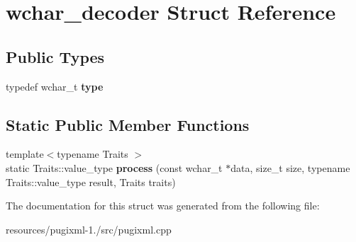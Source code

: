\hypertarget{structwchar__decoder}{\section{wchar\+\_\+decoder Struct Reference}
\label{structwchar__decoder}
}
\subsection*{Public Types}
\begin{DoxyCompactItemize}
\item 
\hypertarget{structwchar__decoder_aafb01f17f51c610468f88b8820e36b7a}{typedef wchar\+\_\+t {\bfseries type}}\label{structwchar__decoder_aafb01f17f51c610468f88b8820e36b7a}

\end{DoxyCompactItemize}
\subsection*{Static Public Member Functions}
\begin{DoxyCompactItemize}
\item 
\hypertarget{structwchar__decoder_a965801bc1ce931281e10ee153586071c}{{\footnotesize template$<$typename Traits $>$ }\\static Traits\+::value\+\_\+type {\bfseries process} (const wchar\+\_\+t $\ast$data, size\+\_\+t size, typename Traits\+::value\+\_\+type result, Traits traits)}\label{structwchar__decoder_a965801bc1ce931281e10ee153586071c}

\end{DoxyCompactItemize}


The documentation for this struct was generated from the following file\+:\begin{DoxyCompactItemize}
\item 
resources/pugixml-\/1./src/pugixml.\+cpp\end{DoxyCompactItemize}
